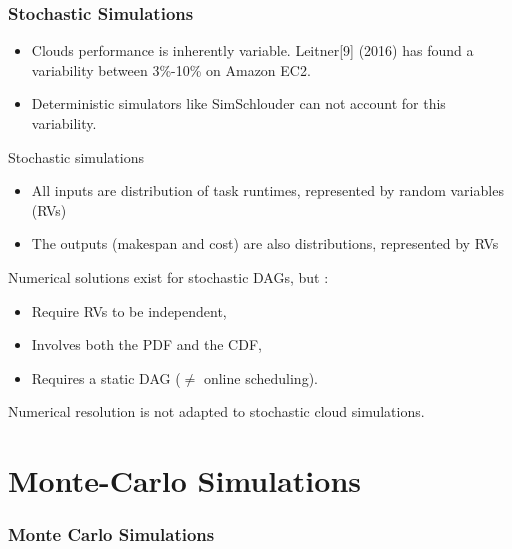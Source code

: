 \documentclass{beamer}
\begin{document}
\begin{frame}
	\frametitle{Stochastic Simulations}
	\begin{itemize}
		\item Clouds performance is inherently variable. Leitner[9] (2016) has found a
	variability between 3\%-10\% on Amazon EC2.\\
	\pause
	 	\item Deterministic simulators like SimSchlouder can not account
			for this variability.
	\end{itemize}
	\pause
	\begin{block}{Stochastic simulations}
	\begin{itemize}
		\item{} All inputs are distribution of task runtimes,
			represented by random variables (RVs)
		\item{} The outputs (makespan and cost) are also
			distributions, represented by RVs
	\end{itemize}
	\end{block}
	\pause
	Numerical solutions exist for stochastic DAGs, but :
	\begin{itemize}
		\item{} Require RVs to be independent,
		\item{} Involves both the PDF and the CDF,
		\item{} Requires a static DAG ($\neq$ online scheduling).
	\end{itemize}
	\pause
	\begin{block}{}
		Numerical resolution is not adapted to stochastic cloud
		simulations.
	\end{block}
\end{frame}

\section{Monte-Carlo Simulations}

\begin{frame}
	\frametitle{Monte Carlo Simulations}
	\resizebox{\textwidth}{!}{}
\end{frame}
\end{document}
